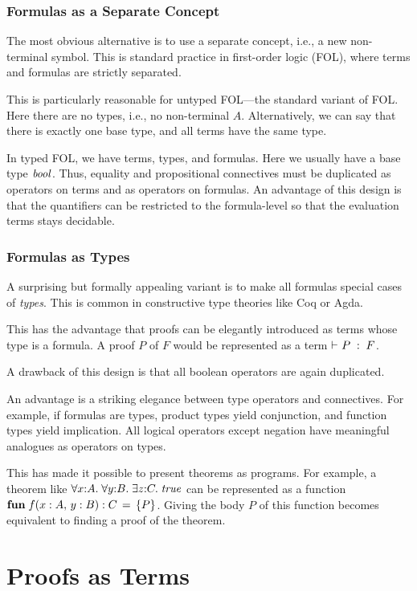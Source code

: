 \subsubsection{Formulas as a Separate Concept}

The most obvious alternative is to use a separate concept, i.e., a new non-terminal symbol.
This is standard practice in first-order logic (FOL), where terms and formulas are strictly separated.

This is particularly reasonable for untyped FOL---the standard variant of FOL.
Here there are no types, i.e., no non-terminal $A$.
Alternatively, we can say that there is exactly one base type, and all terms have the same type.

In typed FOL, we have terms, types, and formulas.
Here we usually have a base type $\mathit{bool}$.
Thus, equality and propositional connectives must be duplicated as operators on terms and as operators on formulas.
An advantage of this design is that the quantifiers can be restricted to the formula-level so that the evaluation terms stays decidable.

\subsubsection{Formulas as Types}

A surprising but formally appealing variant is to make all formulas special cases of \emph{types}.
This is common in constructive type theories like Coq or Agda.

This has the advantage that proofs can be elegantly introduced as terms whose type is a formula.
A proof $P$ of $F$ would be represented as a term $\vdash^{}_{}P\;:\;F$.

A drawback of this design is that all boolean operators are again duplicated.

An advantage is a striking elegance between type operators and connectives.
For example, if formulas are types, product types yield conjunction, and function types yield implication.
All logical operators except negation have meaningful analogues as operators on types.

This has made it possible to present theorems as programs.
For example, a theorem like $\afa[A]{x}{\afa[B]{y}{\aex[C]{z}{\true}}}$ can be represented as a function $\afunI[C]{f}{x:A,y:B}{P}$.
Giving the body $P$ of this function becomes equivalent to finding a proof of the theorem.

\section{Proofs as Terms}

